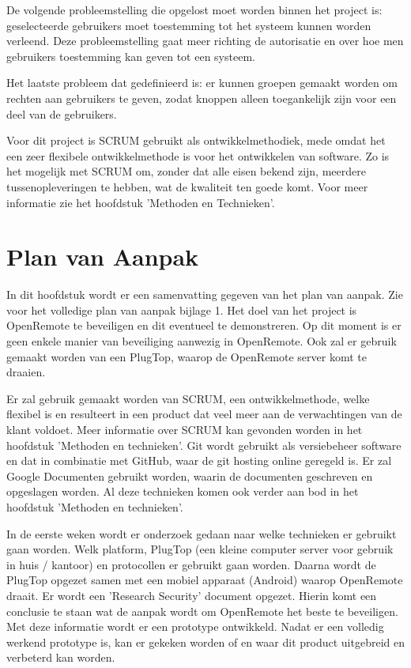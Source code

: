\documentclass[]{article}
\begin{document}
De volgende probleemstelling die opgelost moet worden binnen het project
is: geselecteerde gebruikers moet toestemming tot het systeem kunnen worden
verleend. Deze probleemstelling gaat meer richting de autorisatie en over
hoe men gebruikers toestemming kan geven tot een systeem.

Het laatste probleem dat gedefinieerd is: er kunnen groepen gemaakt worden om
rechten aan gebruikers te geven, zodat knoppen alleen toegankelijk zijn voor een
deel van de gebruikers. 

Voor dit project is SCRUM gebruikt als ontwikkelmethodiek, mede omdat het een
zeer flexibele ontwikkelmethode is voor het ontwikkelen van software. Zo is het
mogelijk met SCRUM om, zonder dat alle eisen bekend zijn, meerdere tussenopleveringen te hebben, 
wat de kwaliteit ten goede komt. Voor meer
informatie zie het hoofdstuk 'Methoden en Technieken'.

\newpage
\section{Plan van Aanpak}

In dit hoofdstuk wordt er een samenvatting gegeven van het plan van aanpak.  Zie
voor het volledige plan van aanpak bijlage 1. Het doel van het project is
OpenRemote  te  beveiligen  en  dit  eventueel  te demonstreren. Op dit moment
is er geen enkele manier van beveiliging aanwezig in OpenRemote. Ook zal er
gebruik gemaakt worden van een PlugTop, waarop  de OpenRemote server komt te
draaien.

Er zal gebruik gemaakt worden van  SCRUM, een ontwikkelmethode, welke flexibel
is en resulteert in een product dat  veel meer aan de verwachtingen van de klant
voldoet. Meer informatie  over  SCRUM kan gevonden worden in het hoofdstuk
'Methoden en technieken'.  Git wordt gebruikt als versiebeheer software en
dat  in  combinatie  met GitHub, waar de git hosting online geregeld is.  Er
zal  Google  Documenten gebruikt worden, waarin de documenten geschreven en
opgeslagen worden.  Al deze technieken komen ook verder aan bod in het
hoofdstuk  'Methoden  en technieken'.

In de eerste weken wordt  er  onderzoek  gedaan  naar  welke  technieken  er
gebruikt gaan worden. Welk platform,  PlugTop (een kleine computer server voor
gebruik in huis / kantoor)  en  protocollen  er  gebruikt gaan worden. Daarna
wordt de PlugTop opgezet samen met een  mobiel  apparaat (Android)  waarop
OpenRemote  draait. Er wordt een 'Research  Security' document opgezet. Hierin
komt een conclusie te staan wat de aanpak wordt  om OpenRemote het beste  te
beveiligen.  Met  deze  informatie  wordt  er  een prototype ontwikkeld. Nadat
er een volledig werkend  prototype  is,  kan  er gekeken worden of en waar dit
product uitgebreid en verbeterd kan worden.
\end{document}
